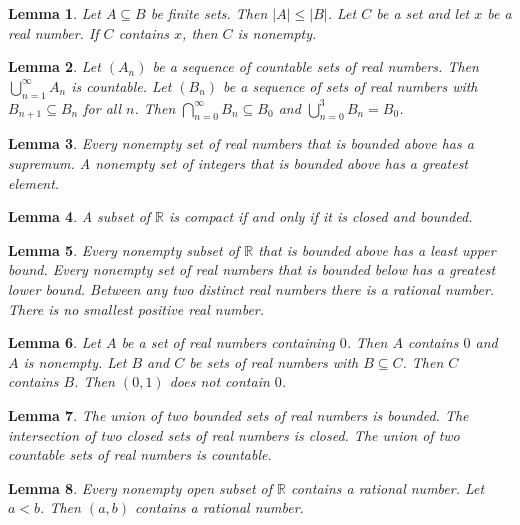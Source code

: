 \documentclass{article}
\newtheorem{lemma}{Lemma}
\begin{document}
\begin{lemma}\label{inclusions}
Let $A\subseteq B$ be finite sets. Then $|A|\le|B|$. Let $C$ be a set and let $x$ be a real number. If $C$ contains $x$, then $C$ is nonempty.
\end{lemma}

\begin{lemma}\label{sequences-of-sets}
Let $(A_n)$ be a sequence of countable sets of real numbers. Then $\bigcup_{n=1}^{\infty}A_n$ is countable. Let $(B_n)$ be a sequence of sets of real numbers with $B_{n+1}\subseteq B_n$ for all $n$. Then $\bigcap_{n=0}^{\infty}B_n\subseteq B_0$ and $\bigcup_{n=0}^{3}B_n=B_0$.
\end{lemma}

\begin{lemma}\label{relative-clauses}
Every nonempty set of real numbers that is bounded above has a supremum. A nonempty set of integers that is bounded above has a greatest element.
\end{lemma}

\begin{lemma}\label{heine-borel}
A subset of $\mathbb{R}$ is compact if and only if it is closed and bounded.
\end{lemma}

\begin{lemma}\label{completeness}
Every nonempty subset of $\mathbb{R}$ that is bounded above has a least upper bound. Every nonempty set of real numbers that is bounded below has a greatest lower bound. Between any two distinct real numbers there is a rational number. There is no smallest positive real number.
\end{lemma}

\begin{lemma}\label{containing-sets}
Let $A$ be a set of real numbers containing $0$. Then $A$ contains $0$ and $A$ is nonempty. Let $B$ and $C$ be sets of real numbers with $B\subseteq C$. Then $C$ contains $B$. Then $(0,1)$ does not contain $0$.
\end{lemma}

\begin{lemma}\label{two-sets}
The union of two bounded sets of real numbers is bounded. The intersection of two closed sets of real numbers is closed. The union of two countable sets of real numbers is countable.
\end{lemma}

\begin{lemma}\label{contains-rational}
Every nonempty open subset of $\mathbb{R}$ contains a rational number. Let $a<b$. Then $(a,b)$ contains a rational number.
\end{lemma}
\end{document}
